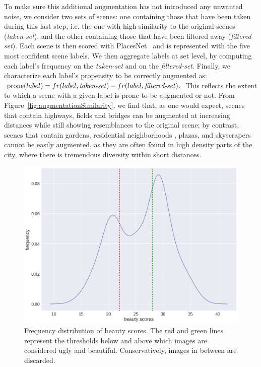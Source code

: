 To make sure this additional augmentation has not introduced any unwanted noise, we consider  two sets of scenes: one containing those that have been taken during this last step, i.e. the one with high similarity to the original scenes (\emph{taken-set}), and the other containing those that have been filtered away (\emph{filtered-set}). Each scene is then scored with PlacesNet~\cite{zhou2014learning} and is represented with the five most confident scene labels. We then aggregate labels at set level, by computing each label's frequency on the \emph{taken-set} %
and on the \emph{filtered-set}. Finally, we characterize each label's propensity to be correctly augmented as: 
$ \textrm{prone}(label)= fr(label,\textrm{\emph{taken-set}}) - fr(label,\textrm{\emph{filtered-set}}).$
This reflects the extent to which a scene with a given label is prone to be augmented or not. From Figure~\ref{fig:augmentationSimilarity}, we find that, as one would expect, scenes that contain highways, fields and bridges can be augmented at increasing distances while still showing resemblances to the original scene; by contrast, scenes that contain gardens, residential neighborhoods , plazas, and skyscrapers cannot be easily augmented, as they are often found in high density parts of the city, where there is tremendous diversity within short distances. 


\begin{figure}[t!]
	\centering
	\includegraphics[width=0.7\columnwidth]{Plot/Trueskill.png}
	\caption{Frequency distribution of beauty scores. The red and green lines represent the thresholds below and above which images are considered ugly and beautiful. Conservatively, images in between are discarded.}
	\label{fig:Trueskill}
\end{figure}


